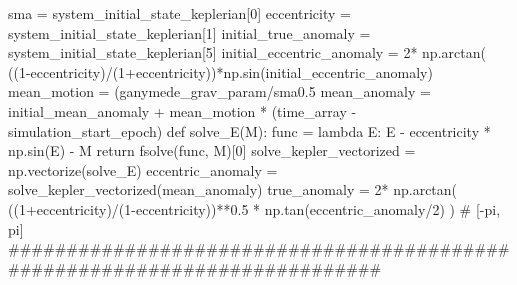 {}
\markdownRendererSectionEnd \markdownRendererSectionBegin
{}\markdownRendererInterblockSeparator
{}
\markdownRendererSectionEnd \markdownRendererSectionBegin
{}\markdownRendererInterblockSeparator
{}sma = system_initial_state_keplerian[0] eccentricity = system_initial_state_keplerian[1] initial_true_anomaly = system_initial_state_keplerian[5] initial_eccentric_anomaly = 2* np.arctan( ((1-eccentricity)/(1+eccentricity))*np.sin(initial_eccentric_anomaly)\markdownRendererInterblockSeparator
{}
\markdownRendererSectionEnd \markdownRendererSectionBegin
{}\markdownRendererInterblockSeparator
{}
\markdownRendererSectionEnd \markdownRendererSectionBegin
{}\markdownRendererInterblockSeparator
{}mean_motion = (ganymede_grav_param/sma0.5 mean_anomaly = initial_mean_anomaly + mean_motion * (time_array - simulation_start_epoch)\markdownRendererInterblockSeparator
{}
\markdownRendererSectionEnd \markdownRendererSectionBegin
{}\markdownRendererInterblockSeparator
{}def solve_E(M): func = lambda E: E - eccentricity * np.sin(E) - M return fsolve(func, M)[0] solve_kepler_vectorized = np.vectorize(solve_E) eccentric_anomaly = solve_kepler_vectorized(mean_anomaly)\markdownRendererInterblockSeparator
{}
\markdownRendererSectionEnd \markdownRendererSectionBegin
{}\markdownRendererInterblockSeparator
{}true_anomaly = 2* np.arctan( ((1+eccentricity)/(1-eccentricity))**0.5 * np.tan(eccentric_anomaly/2) ) # [-pi, pi]\markdownRendererInterblockSeparator
{}
\markdownRendererSectionEnd \markdownRendererSectionBegin
{}\markdownRendererInterblockSeparator
{}
\markdownRendererSectionEnd \markdownRendererSectionBegin
{}\markdownRendererInterblockSeparator
{}###########################################################################\markdownRendererInterblockSeparator
{}
\markdownRendererSectionEnd \markdownRendererSectionBegin
